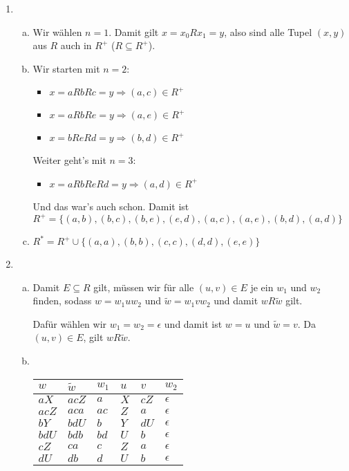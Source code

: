 \begin{enumerate}[1.]
  \item
    \begin{enumerate}[(a)]
      \item Wir wählen $n = 1$. Damit gilt $x = x_0 R x_1 = y$, also sind alle
        Tupel $(x,y)$ aus $R$ auch in $R^+$ ($R \subseteq R^+$).

      \item Wir starten mit $n = 2$:
        \begin{itemize}
          \item $x = aRbRc = y \Rightarrow (a,c) \in R^+$
          \item $x = aRbRe = y \Rightarrow (a,e) \in R^+$
          \item $x = bReRd = y \Rightarrow (b,d) \in R^+$
        \end{itemize}

        Weiter geht’s mit $n = 3$:
        \begin{itemize}
          \item $x = aRbReRd = y \Rightarrow (a,d) \in R^+$
        \end{itemize}

        Und das war’s auch schon. Damit ist
        $R^+ = \{(a,b), (b,c), (b,e), (e,d), (a,c), (a,e), (b,d), (a,d)\}$

      \item $R^* = R^+ \cup \{(a,a), (b,b), (c,c), (d,d), (e,e)\}$
    \end{enumerate}

  \item
    \begin{enumerate}[(a)]
      \item Damit $E \subseteq R$ gilt, müssen wir für alle $(u,v) \in E$ je
        ein $w_1$ und $w_2$ finden, sodass $w = w_1 u w_2$ und $\tilde{w} = w_1
        v w_2$ und damit $w R \tilde{w}$ gilt.

        Dafür wählen wir $w_1 = w_2 = \epsilon$ und damit ist $w = u$ und
        $\tilde{w} = v$. Da $(u,v) \in E$, gilt $wR\tilde{w}$.

      \item\
        \begin{center}
          \begin{tabular}{llllll}
            \toprule
            $w$ & $\tilde{w}$ & $w_1$ & $u$ & $v$& $w_2$\\
            \midrule
            $aX$ & $acZ$ & $a$ & $X$ & $cZ$ & $\epsilon$\\
            $acZ$ & $aca$ & $ac$ & $Z$ & $a$ & $\epsilon$\\
            $bY$ & $bdU$ & $b$ & $Y$ & $dU$ & $\epsilon$\\
            $bdU$ & $bdb$ & $bd$ & $U$ & $b$ & $\epsilon$\\
            $cZ$ & $ca$ & $c$ & $Z$ & $a$ & $\epsilon$\\
            $dU$ & $db$ & $d$ & $U$ & $b$ & $\epsilon$
          \end{tabular}
        \end{center}


\end{enumerate}
\end{enumerate}
